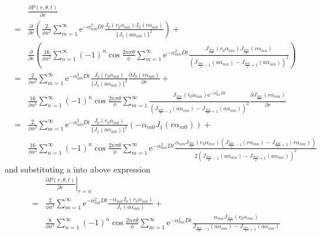 \documentclass{article}
\begin{document}
\begin{eqnarray}
    & & \frac{\partial P(r, \theta, t)}{\partial r} \nonumber\\
    &=& \frac{\partial}{\partial r}\left(
        \frac{2}{\phi a^2} \sum^{\infty}_{m=1}
        \mathrm{e}^{-\alpha_{m0}^2Dt}
        \frac{J_0(r_0\alpha_{m0})J_0(r\alpha_{m0})}
             {\{J_1(a\alpha_{m0})\}^2}\right) + \nonumber\\
    & & \frac{\partial}{\partial r}\left(
        \frac{16}{\phi a^2}\sum^{\infty}_{n=1}
        (-1)^n\cos\frac{2n\pi\theta}{\phi}
        \sum^{\infty}_{m=1}
        \mathrm{e}^{-\alpha_{mn}^2Dt}
        \frac{J_{\frac{2n\pi}{\phi}}(r_0\alpha_{mn})
              J_{\frac{2n\pi}{\phi}}(r  \alpha_{mn})}
             {(J_{\frac{2n\pi}{\phi} - 1}(a\alpha_{mn}) -
               J_{\frac{2n\pi}{\phi} + 1}(a\alpha_{mn}))^2}
        \right)
        \nonumber\\
    &=& \frac{2}{\phi a^2} \sum^{\infty}_{m=1}
        \mathrm{e}^{-\alpha_{m0}^2Dt}
        \frac{J_0(r_0\alpha_{m0})}{\{J_1(a\alpha_{m0})\}^2}
        \frac{\partial J_0(r\alpha_{m0})}{\partial r} + \nonumber\\
    & & \frac{16}{\phi a^2}\sum^{\infty}_{n=1}
        (-1)^n\cos\frac{2n\pi\theta}{\phi}
        \sum^{\infty}_{m=1}
        \frac{J_{\frac{2n\pi}{\phi}}(r_0\alpha_{mn})
              \mathrm{e}^{-\alpha_{mn}^2Dt}}
             {(J_{\frac{2n\pi}{\phi} - 1}(a\alpha_{mn}) -
               J_{\frac{2n\pi}{\phi} + 1}(a\alpha_{mn}))^2}
        \frac{\partial J_{\frac{2n\pi}{\phi}}(r  \alpha_{mn})}
        {\partial r}\nonumber \\
    &=& \frac{2}{\phi a^2} \sum^{\infty}_{m=1}
        \mathrm{e}^{-\alpha_{m0}^2Dt}
        \frac{J_0(r_0\alpha_{m0})}{\{J_1(a\alpha_{m0})\}^2}
        (-\alpha_{m0}J_1(r\alpha_{m0})) + \nonumber\\
    & & \frac{16}{\phi a^2}\sum^{\infty}_{n=1}
        (-1)^n\cos\frac{2n\pi\theta}{\phi}
        \sum^{\infty}_{m=1}
        \mathrm{e}^{-\alpha_{mn}^2Dt}
        \frac{\alpha_{mn}J_{\frac{2n\pi}{\phi}}(r_0\alpha_{mn})
             (J_{\frac{2n\pi}{\phi} - 1}(r\alpha_{mn}) -
              J_{\frac{2n\pi}{\phi} + 1}(r\alpha_{mn}))}
             {2(J_{\frac{2n\pi}{\phi} - 1}(a\alpha_{mn}) -
              J_{\frac{2n\pi}{\phi} + 1}(a\alpha_{mn}))^2}
        \nonumber
\end{eqnarray}
and substituting a into above expression
\begin{eqnarray}
    & & \left.\frac{\partial P(r, \theta, t)}{\partial r}\right|_{r = a} \nonumber\\
    &=& \frac{2}{\phi a^2} \sum^{\infty}_{m=1}
        \mathrm{e}^{-\alpha_{m0}^2Dt}
        \frac{-\alpha_{m0}J_0(r_0\alpha_{m0})}{J_1(a\alpha_{m0})} +\nonumber\\
    & & \frac{8}{\phi a^2}\sum^{\infty}_{n=1}
        (-1)^n\cos\frac{2n\pi\theta}{\phi}
        \sum^{\infty}_{m=1}
        \mathrm{e}^{-\alpha_{mn}^2Dt}
        \frac{\alpha_{mn}J_{\frac{2n\pi}{\phi}}(r_0\alpha_{mn})}
             {J_{\frac{2n\pi}{\phi} - 1}(a\alpha_{mn}) -
              J_{\frac{2n\pi}{\phi} + 1}(a\alpha_{mn})}
        \nonumber
\end{eqnarray}
\end{document}
